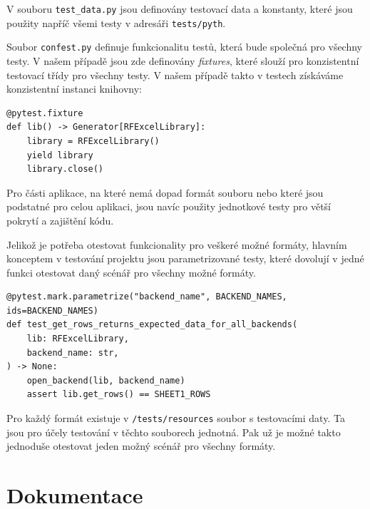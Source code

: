 V souboru \texttt{test\_data.py} jsou definovány testovací data a konstanty, které jsou použity napříč všemi testy v adresáři \texttt{tests/pyth}.

Soubor \texttt{confest.py} definuje funkcionalitu testů, která bude společná pro všechny testy. V našem případě jsou zde definovány \textit{fixtures}, které slouží pro konzistentní testovací třídy pro všechny testy. V našem případě takto v testech získáváme konzistentní instanci knihovny:

\begin{listing}[H]
    \begin{verbatim}
@pytest.fixture
def lib() -> Generator[RFExcelLibrary]:
    library = RFExcelLibrary()
    yield library
    library.close()
    \end{verbatim}
    
    \caption{Pytest fixture - vlastní tvorba}
    \label{list:demo-library}
\end{listing}

Pro části aplikace, na které nemá dopad formát souboru nebo které jsou podstatné pro celou aplikaci, jsou navíc použity jednotkové testy pro větší pokrytí a zajištění kódu.

Jelikož je potřeba otestovat funkcionality pro veškeré možné formáty, hlavním konceptem v testování projektu jsou parametrizované testy, které dovolují v jedné funkci otestovat daný scénář pro všechny možné formáty.

\begin{listing}[H]
    \begin{verbatim}
@pytest.mark.parametrize("backend_name", BACKEND_NAMES, ids=BACKEND_NAMES)
def test_get_rows_returns_expected_data_for_all_backends(
    lib: RFExcelLibrary,
    backend_name: str,
) -> None:
    open_backend(lib, backend_name)
    assert lib.get_rows() == SHEET1_ROWS
    \end{verbatim}
    
    \caption{Příklad parametrizovaného testu - vlastní tvorba}
    \label{list:demo-library}
\end{listing}

Pro každý formát existuje v \texttt{/tests/resources} soubor s testovacími daty. Ta jsou pro účely testování v těchto souborech jednotná. Pak už je možné takto jednoduše otestovat jeden možný scénář pro všechny formáty.

\section{Dokumentace}

